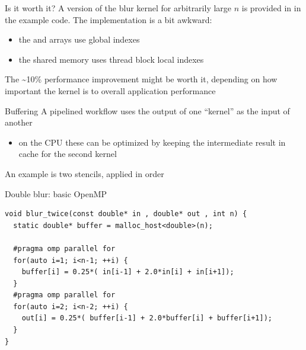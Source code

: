 \begin{frame}[fragile]{}
    \begin{info}{Is it worth it?}
        A version of the blur kernel for arbitrarily large $n$ is provided in  in the example code. The implementation is a bit awkward:
        \begin{itemize}
            \item  the  and  arrays use global indexes
            \item  the shared memory uses thread block local indexes
        \end{itemize}
        The \textasciitilde10\% performance improvement might be worth it, depending on how important the kernel is to overall application performance
    \end{info}

\end{frame}

\begin{frame}[fragile]{}
    \begin{info}{Buffering}
        A pipelined workflow uses the output of one ``kernel'' as the input of another
        \begin{itemize}
            \item on the CPU these can be optimized by keeping the intermediate result in cache for the second kernel
        \end{itemize}
        An example is two stencils, applied in order
    \end{info}

    \begin{code}{Double blur: basic OpenMP}
        \begin{lstlisting}[style=boxcudatiny]
void blur_twice(const double* in , double* out , int n) {
  static double* buffer = malloc_host<double>(n);

  #pragma omp parallel for
  for(auto i=1; i<n-1; ++i) {
    buffer[i] = 0.25*( in[i-1] + 2.0*in[i] + in[i+1]);
  }
  #pragma omp parallel for
  for(auto i=2; i<n-2; ++i) {
    out[i] = 0.25*( buffer[i-1] + 2.0*buffer[i] + buffer[i+1]);
  }
}
        \end{lstlisting}
    \end{code}

\end{frame}

